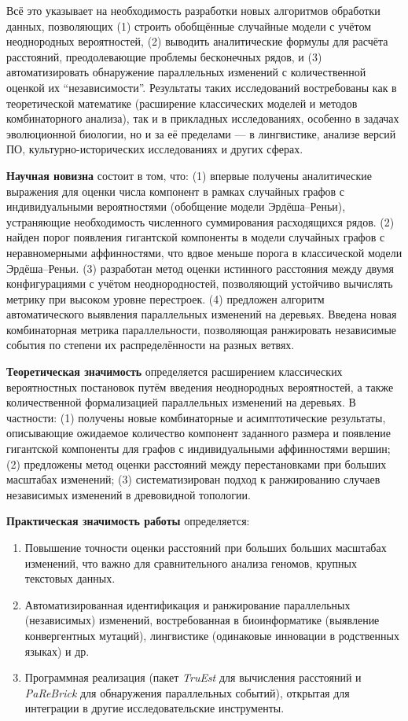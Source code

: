 Всё это указывает на необходимость разработки новых алгоритмов обработки данных, позволяющих (1) строить обобщённые случайные модели с учётом неоднородных вероятностей, (2) выводить аналитические формулы для расчёта расстояний, преодолевающие проблемы бесконечных рядов, и (3) автоматизировать обнаружение параллельных изменений с количественной оценкой их ``независимости''.  
Результаты таких исследований востребованы как в теоретической математике (расширение классических моделей и методов комбинаторного анализа), так и в прикладных исследованиях, особенно в задачах эволюционной биологии, но и за её пределами --- в лингвистике, анализе версий ПО, культурно-исторических исследованиях и других сферах.  

\textbf{Научная новизна} состоит в том, что: 
(1) впервые получены аналитические выражения для оценки числа компонент в рамках случайных графов с индивидуальными вероятностями (обобщение модели Эрдёша--Реньи), устраняющие необходимость численного суммирования расходящихся рядов.
(2) найден порог появления гигантской компоненты в модели случайных графов с неравномерными аффинностями, что вдвое меньше порога в классической модели Эрдёша–Реньи.
(3) разработан метод оценки истинного расстояния между двумя конфигурациями с учётом неоднородностей, позволяющий устойчиво вычислять метрику при высоком уровне перестроек. 
(4) предложен алгоритм автоматического выявления параллельных изменений на деревьях. 
Введена новая комбинаторная метрика параллельности, позволяющая ранжировать независимые события по степени их распределённости на разных ветвях.


\textbf{Теоретическая значимость} определяется расширением классических вероятностных постановок путём введения неоднородных вероятностей, а также количественной формализацией параллельных изменений на деревьях.  
В частности: (1) получены новые комбинаторные и асимптотические результаты, описывающие ожидаемое количество компонент заданного размера и появление гигантской компоненты для графов с индивидуальными аффинностями вершин; 
(2) предложены метод оценки расстояний между перестановками при больших масштабах изменений;
(3) систематизирован подход к ранжированию случаев независимых изменений в древовидной топологии.

\textbf{Практическая значимость работы} определяется:

\begin{enumerate}
    \item Повышение точности оценки расстояний при больших больших масштабах изменений, что важно для сравнительного анализа геномов, крупных текстовых данных.
    \item Автоматизированная идентификация и ранжирование параллельных (независимых) изменений, востребованная в биоинформатике (выявление конвергентных мутаций), лингвистике (одинаковые инновации в родственных языках) и др.
    \item Программная реализация (пакет \emph{TruEst} для вычисления расстояний и \emph{PaReBrick} для обнаружения параллельных событий), открытая для интеграции в другие исследовательские инструменты.
\end{enumerate}

